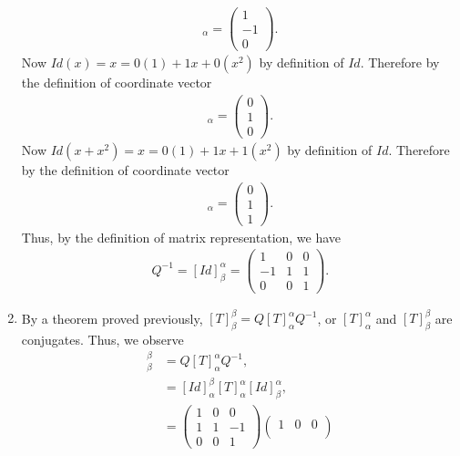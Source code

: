 \documentclass[12pt,answers]{exam}
\begin{document}
\begin{solution}
\begin{enumerate}[label=\roman*)]
\begin{align*}
    [Id(1-x)]_{\alpha}=\begin{pmatrix} 1 \\ -1 \\ 0 \end{pmatrix}.
\end{align*}
Now $Id(x)=x=0(1)+1x+0(x^{2})$ by definition of $Id$. Therefore by the definition of coordinate vector
\begin{align*}
    [Id(x)]_{\alpha}=\begin{pmatrix} 0 \\ 1 \\ 0 \end{pmatrix}.
\end{align*}
Now $Id(x+x^{2})=x=0(1)+1x+1(x^{2})$ by definition of $Id$. Therefore by the definition of coordinate vector
\begin{align*}
    [Id(x+x^{2})]_{\alpha}=\begin{pmatrix} 0 \\ 1 \\ 1 \end{pmatrix}.
\end{align*}
Thus, by the definition of matrix representation, we have
\begin{align*}
    Q^{-1}=[Id]^{\alpha}_{\beta}=\begin{pmatrix} 1 & 0 & 0 \\
                                                 -1 & 1 & 1 \\
                                                 0 & 0 & 1 \end{pmatrix}.
\end{align*}
\item By a theorem proved previously, $[T]^{\beta}_{\beta}=Q[T]^{\alpha}_{\alpha}Q^{-1}$, or $[T]^{\alpha}_{\alpha}$ and $[T]^{\beta}_{\beta}$ are conjugates. Thus, we observe
\begin{align*}
    [T]^{\beta}_{\beta}&=Q[T]^{\alpha}_{\alpha}Q^{-1}, \\
    &=[Id]^{\beta}_{\alpha}[T]^{\alpha}_{\alpha}[Id]^{\alpha}_{\beta}, \\
    &=\begin{pmatrix} 1 & 0 & 0 \\
                      1 & 1 & -1 \\
                      0 & 0 & 1 \end{pmatrix} 
      \begin{pmatrix} 1 & 0 & 0 \\

\end{pmatrix}
\end{align*}
\end{enumerate}
\end{solution}
\end{document}
